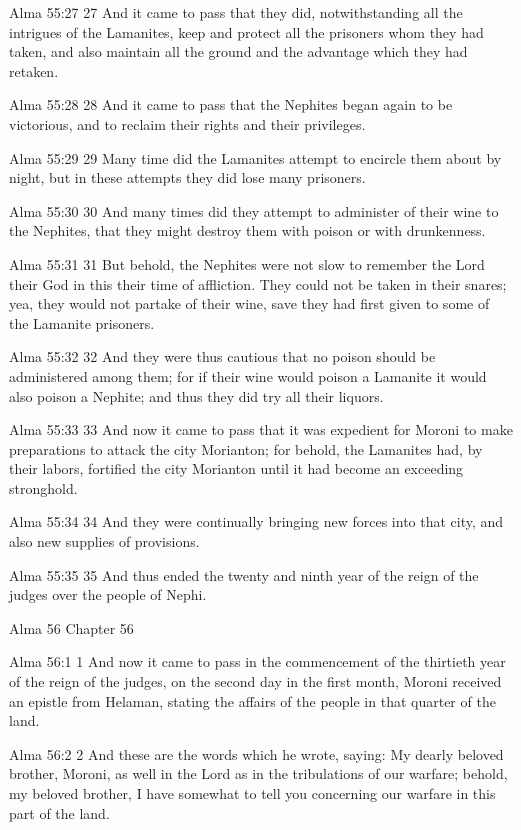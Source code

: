 Alma 55:27
 27 And it came to pass that they did, notwithstanding all the
intrigues of the Lamanites, keep and protect all the prisoners
whom they had taken, and also maintain all the ground and the
advantage which they had retaken.

Alma 55:28
 28 And it came to pass that the Nephites began again to be
victorious, and to reclaim their rights and their privileges.

Alma 55:29
 29 Many time did the Lamanites attempt to encircle them about by
night, but in these attempts they did lose many prisoners.

Alma 55:30
 30 And many times did they attempt to administer of their wine
to the Nephites, that they might destroy them with poison or with
drunkenness.

Alma 55:31
 31 But behold, the Nephites were not slow to remember the Lord
their God in this their time of affliction. They could not be
taken in their snares; yea, they would not partake of their wine,
save they had first given to some of the Lamanite prisoners.

Alma 55:32
 32 And they were thus cautious that no poison should be
administered among them; for if their wine would poison a
Lamanite it would also poison a Nephite; and thus they did try
all their liquors.

Alma 55:33
 33 And now it came to pass that it was expedient for Moroni to
make preparations to attack the city Morianton; for behold, the
Lamanites had, by their labors, fortified the city Morianton
until it had become an exceeding stronghold.

Alma 55:34
 34 And they were continually bringing new forces into that city,
and also new supplies of provisions.

Alma 55:35
 35 And thus ended the twenty and ninth year of the reign of the
judges over the people of Nephi.

Alma 56
Chapter 56

Alma 56:1
 1 And now it came to pass in the commencement of the thirtieth
year of the reign of the judges, on the second day in the first
month, Moroni received an epistle from Helaman, stating the
affairs of the people in that quarter of the land.

Alma 56:2
 2 And these are the words which he wrote, saying: My dearly
beloved brother, Moroni, as well in the Lord as in the
tribulations of our warfare; behold, my beloved brother, I have
somewhat to tell you concerning our warfare in this part of the
land.

